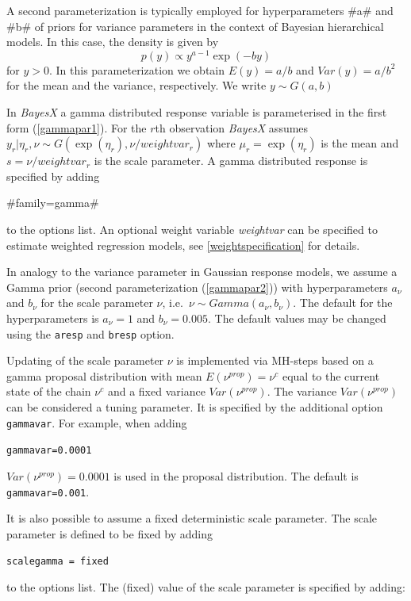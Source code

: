 A second parameterization is typically employed for
hyperparameters #a# and #b# of priors for variance parameters in
the context of Bayesian hierarchical models. In this case, the
density is given by
\begin{equation}
\label{gammapar2} p(y) \propto y^{a-1}\exp(-b y)
\end{equation}
for $y>0$. In this parameterization we obtain $E(y) = a/b$ and
$Var(y) = a/b^2$ for the mean and the variance, respectively. We
write $y \sim G(a,b)$

In {\em BayesX} a gamma distributed response variable is
parameterised in the first form (\ref{gammapar1}). For the $r$th
observation {\em BayesX} assumes  $y_r | \eta_r,\nu \sim
G(\exp(\eta_r),\nu/weightvar_r)$ where $\mu_r = \exp(\eta_r)$ is
the mean and $s=\nu/weightvar_r$ is the scale parameter. A gamma
distributed response is specified by adding

#family=gamma#

to the options list. An optional weight variable {\em weightvar}
can be specified to estimate weighted regression models, see
\autoref{weightspecification} for details.

In analogy to the variance parameter in Gaussian response models,
we assume a Gamma prior (second parameterization
(\ref{gammapar2})) with hyperparameters $a_{\nu}$ and $b_{\nu}$
for the scale parameter $\nu$, i.e.~$\nu \sim
Gamma(a_{\nu},b_{\nu})$. The default for the hyperparameters is
$a_{\nu}=1$ and $b_{\nu}=0.005$. The default values may be changed
using the {\tt aresp} and {\tt bresp} option.

Updating of the scale parameter $\nu$ is implemented via MH-steps
based on a gamma proposal distribution with mean $E(\nu^{prop}) =
\nu^{c}$ equal to the current state of the chain $\nu^c$ and a
fixed variance $Var(\nu^{prop})$. The variance $Var(\nu^{prop})$
can be considered a tuning parameter. It is specified by the
additional option {\tt gammavar}. For example, when adding

{\tt gammavar=0.0001}

$Var(\nu^{prop}) = 0.0001$ is used in the proposal distribution.
The default is {\tt gammavar=0.001}.

It is also possible to assume a fixed deterministic scale
parameter. The scale parameter is defined to be fixed by adding

{\tt scalegamma = fixed}

to the options list. The (fixed) value of the scale parameter is
specified by adding:


